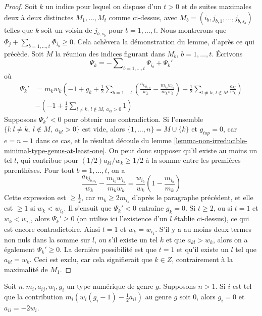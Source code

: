 \begin{proof}
\medskip\noindent
Soit $k$ un indice pour lequel on dispose d'un $t > 0$ et de suites
maximales deux à deux distinctes $M_1, \ldots, M_t$ comme ci-dessus, avec
$M_b = (i_b, j_{b, 1}, \ldots, j_{b, s_b})$
telles que $k$ soit un voisin de $j_{b, s_b}$ pour $b = 1, \ldots, t$.
Nous montrerons que $\Phi_j + \sum_{b = 1, \ldots, t} \Phi_{i_b} \geq 0$.
Cela achèvera la démonstration du lemme, d'après ce qui précède.
Soit $M$ la réunion des indices figurant dans $M_b$, $b = 1, \ldots, t$.
Écrivons
$$
\Psi_k =
-\sum\nolimits_{b = 1, \ldots, t} \Psi_{i_b} + \Psi_k'
$$
où
\begin{align*}
\Psi_k' & =
m_kw_k\left(-1 + g_k +
\frac{1}{2} \sum\nolimits_{b = 1, \ldots t}
(\frac{a_{kj_{b, s_b}}}{w_k} - \frac{m_{i_b}w_{i_b}}{m_kw_k}) +
\frac{1}{2} \sum\nolimits_{l \not = k,\ l \not \in M}
\frac{a_{kl}}{w_k}
\right) \\
&
-\left(
-1 + \frac{1}{2}\sum\nolimits_{l \not = k,\ l \not \in M,\ a_{kl} > 0} 1
\right)
\end{align*}
Supposons $\Psi_k' < 0$ pour obtenir une contradiction.
Si l'ensemble $\{l : l \not = k,\ l \not \in M,\ a_{kl} > 0\}$ est vide,
alors $\{1, \ldots, n\} = M \cup \{k\}$ et $g_{top} = 0$,
car $e = n - 1$ dans ce cas, et le résultat découle du
lemme \ref{lemma-non-irreducible-minimal-type-genus-at-least-one}.
On peut donc supposer qu'il existe au moins un tel $l$, qui contribue
pour $(1/2)a_{kl}/w_k \geq 1/2$ à la somme entre les premières parenthèses.
Pour tout $b = 1, \ldots, t$, on a
$$
\frac{a_{kj_{b, s_b}}}{w_k} - \frac{m_{i_b}w_{i_b}}{m_kw_k} =
\frac{w_{i_b}}{w_k}(1 - \frac{m_{i_b}}{m_k})
$$
Cette expression est $\geq \frac{1}{2}$, car $m_k \geq 2m_{i_b}$
d'après le paragraphe précédent, et elle est $\geq 1$ si $w_k < w_{i_b}$.
Il s'ensuit que $\Psi_k' < 0$ entraîne $g_k = 0$.
Si $t \geq 2$, ou si $t = 1$ et $w_k < w_{i_1}$, alors $\Psi_k' \geq 0$
(on utilise ici l'existence d'un $l$ établie ci-dessus), ce qui
est encore contradictoire.
Ainsi $t = 1$ et $w_k = w_{i_1}$. S'il y a au moins deux termes non nuls
dans la somme sur $l$, ou s'il existe un tel $k$ et que $a_{kl} > w_k$, alors
on a également $\Psi_k' \geq 0$. La dernière possibilité est que $t = 1$ et
qu'il existe un $l$ tel que $a_{kl} = w_k$. Ceci est exclu, car cela
signifierait que $k \in Z$, contrairement à la maximalité de $M_1$.
\end{proof}

\begin{lemma}
\label{lemma-minus-two}
Soit $n, m_i, a_{ij}, w_i, g_i$ un type numérique de genre $g$.
Supposons $n > 1$. Si $i$ est tel que la contribution
$m_i(w_i(g_i - 1) - \frac{1}{2} a_{ii})$
au genre $g$ soit $0$, alors $g_i = 0$ et $a_{ii} = -2w_i$.
\end{lemma}


